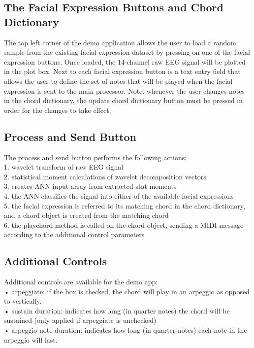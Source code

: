 \subsection{The Facial Expression Buttons and Chord Dictionary}
The top left corner of the demo application allows the user to load a random sample from the existing facial expression dataset by pressing on one of the facial expression buttons. Once loaded, the 14-channel raw EEG signal will be plotted in the plot box.
Next to each facial expression button is a text entry field that allows the user to define the set of notes that will be played when the facial expression is sent to the main processor. Note: whenever the user changes notes in the chord dictionary, the update chord dictionary button must be pressed in order for the changes to take effect.

\subsection{Process and Send Button}
The process and send button performs the following actions:\\
1.	wavelet transform of raw EEG signal\\
2.	statistical moment calculations of wavelet decomposition vectors\\
3.	creates ANN input array from extracted stat moments\\
4.	the ANN classifies the signal into either of the available facial expressions\\
5.	the facial expression is referred to its matching chord in the chord dictionary, and a chord object is created from the matching chord\\
6.	the playchord method is called on the chord object, sending a MIDI message according to the additional control parameters\

\subsection{Additional Controls}
Additional controls are available for the demo app:\\
•	arpeggiate: if the box is checked, the chord will play in an arpeggio as opposed to vertically.\\
•	sustain duration: indicates how long (in quarter notes) the chord will be sustained (only applied if arpeggiate is unchecked)\\
•	arpeggio note duration: indicates how long (in quarter notes) each note in the arpeggio will last.\\

